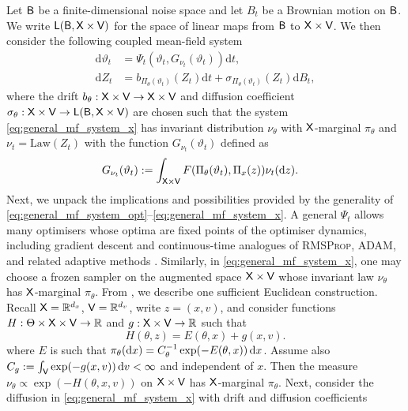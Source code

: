 Let ${\mathsf{B}}$ be a finite-dimensional noise space and let $B_t$ be a Brownian motion on ${\mathsf{B}}$. We write ${\mathsf{L}}({\mathsf{B}},{\mathsf{X}}\times{\mathsf{V}})$ for the space of
linear maps from ${\mathsf{B}}$ to ${\mathsf{X}}\times{\mathsf{V}}$. We then consider the following coupled mean-field system
\begin{align}
\mathrm{d} \vartheta_t &= \Psi_t(\vartheta_t,G_{\nu_t}(\vartheta_t)) \mathrm{d} t, \label{eq:general_mf_system_opt}\\
\mathrm{d} Z_t &= b_{\Pi_\theta(\vartheta_t)}(Z_t) \mathrm{d}t  +\sigma_{\Pi_\theta(\vartheta_t)}(Z_t)\mathrm{d}B_t, \label{eq:general_mf_system_x}
\end{align}
where the drift $b_\theta:{\mathsf{X}}\times{\mathsf{V}}\to{\mathsf{X}}\times{\mathsf{V}}$ and diffusion coefficient
$\sigma_\theta:{\mathsf{X}}\times{\mathsf{V}}\to{\mathsf{L}}({\mathsf{B}},{\mathsf{X}}\times{\mathsf{V}})$ are chosen such that the system \eqref{eq:general_mf_system_x} has invariant distribution $\nu_\theta$ with ${\mathsf{X}}$-marginal $\pi_\theta$ and $\nu_t = \mathrm{Law}(Z_t)$ with the function $G_{\nu_t}(\vartheta_t)$ defined as
\begin{align*}
G_{\nu_t}(\vartheta_t)&:=\int_{{\mathsf{X}}\times{\mathsf{V}}} F(\Pi_\theta(\vartheta_t),\Pi_x(z))\nu_t(\mathrm{d} z).
\end{align*}
Next, we unpack the implications and possibilities provided by the generality of \eqref{eq:general_mf_system_opt}--\eqref{eq:general_mf_system_x}. A general $\Psi_t$ allows many optimisers whose optima are fixed points of the optimiser dynamics, including gradient descent and continuous-time analogues of \textsc{RMSProp}, \textsc{ADAM}, and related adaptive methods \citep{da2020general,barakat_convergence_2021, heredia2026modelingadagradrmspropadam}. Similarly, in \eqref{eq:general_mf_system_x}, one may choose a frozen sampler on the augmented space ${\mathsf{X}}\times{\mathsf{V}}$ whose invariant law $\nu_\theta$ has ${\mathsf{X}}$-marginal $\pi_\theta$. From \citet{Ma_SGMCMC}, we describe one sufficient Euclidean construction. Recall ${\mathsf{X}}=\mathbb{R}^{d_x}$, ${\mathsf{V}}=\mathbb{R}^{d_v}$, write $z=(x,v)$, and consider functions $H:\Theta\times{\mathsf{X}}\times{\mathsf{V}}\to\mathbb{R}$ and $g:{\mathsf{X}}\times{\mathsf{V}}\to\mathbb{R}$ such that
\begin{equation*}
    H(\theta,z) = E(\theta,x) + g(x, v).
\end{equation*}
where $E$ is such that $\pi_\theta(\mathrm{d} x)=C_\theta^{-1}\exp(-E(\theta,x))\,\mathrm{d} x$. Assume also
$C_g:=\int_{{\mathsf{V}}}\exp(-g(x,v))\,\mathrm{d} v < \infty$ and independent of $x$. Then the measure $\nu_\theta \propto \exp(-H(\theta,x,v))$ on ${\mathsf{X}}\times{\mathsf{V}}$ has ${\mathsf{X}}$-marginal $\pi_\theta$. Next, consider the diffusion in \eqref{eq:general_mf_system_x} with drift and diffusion coefficients
